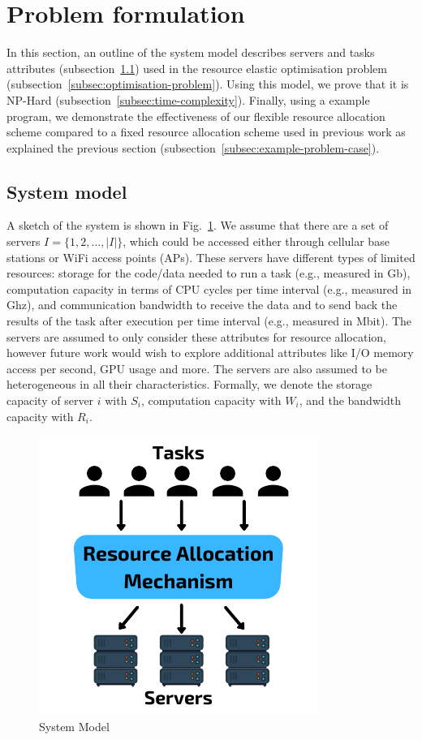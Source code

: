\section{Problem formulation}
\label{sec:problem-formulation}
In this section, an outline of the system model describes servers and tasks attributes
(subsection~\ref{subsec:system-model}) used in the resource elastic optimisation problem
(subsection~\ref{subsec:optimisation-problem}). Using this model, we prove that it is NP-Hard
(subsection~\ref{subsec:time-complexity}). Finally, using a example program, we demonstrate the effectiveness of our
flexible resource allocation scheme compared to a fixed resource allocation scheme used in previous work as explained
the previous section (subsection~\ref{subsec:example-problem-case}).

\subsection{System model}\label{subsec:system-model}
A sketch of the system is shown in Fig.~\ref{fig:system-model}.
We assume that there are a set of servers $I = \{1,2,\ldots,\left|I\right|\}$, which could be accessed either through
cellular base stations or WiFi access points (APs). These servers have different types of limited resources:
storage for the code/data needed to run a task (e.g., measured in Gb), computation capacity in terms of CPU cycles per
time interval (e.g., measured in Ghz), and communication bandwidth to receive the data and to send back the results
of the task after execution per time interval (e.g., measured in Mbit). The servers are assumed to only consider these 
attributes for resource allocation, however future work would wish to explore additional attributes like I/O memory
access per second, GPU usage and more. The servers are also assumed to be heterogeneous in all their characteristics. 
Formally, we denote the storage capacity of server $i$ with $S_i$, computation capacity with $W_i$, and the 
bandwidth capacity with $R_i$.

\begin{figure}
    \centering
    \includegraphics[width=0.58\linewidth]{figs/system_model.pdf}
    \caption{System Model}
    \label{fig:system-model}
\end{figure}

